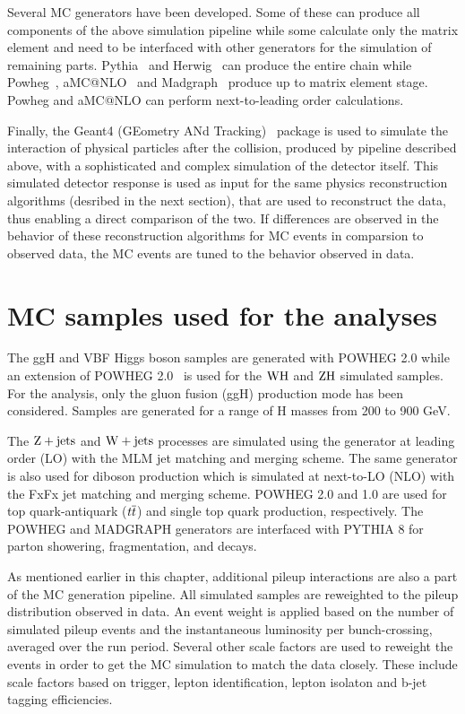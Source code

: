 Several MC generators have been developed. Some of these can produce all components of the above simulation pipeline while some calculate only the matrix element and need to be interfaced with other generators for the simulation of remaining parts. Pythia~\cite{Sjostrand:pythia8} and Herwig~\cite{herwig} can produce the entire chain while Powheg~\cite{Nason:2004rx,Frixione:2007vw, Alioli:2010xd, Alioli:2010xa, Alioli:2008tz, Bagnaschi:2011tu}, aMC@NLO~\cite{Alwall:2014} and Madgraph~\cite{Alwall:2011uj} produce up to matrix element stage. Powheg and aMC@NLO can perform next-to-leading order calculations. 

Finally, the Geant4 (GEometry ANd Tracking)~\cite{GEANT4} package is used to simulate the interaction of physical particles after the collision, produced by pipeline described  above, with a sophisticated and complex simulation of the detector itself. This simulated detector response is used as input for the same physics reconstruction algorithms (desribed in the next section), that are used to reconstruct the data, thus enabling a direct comparison of the two. If differences are observed in the behavior of these reconstruction algorithms for MC events in comparsion to observed data, the MC events are tuned to the behavior observed in data. 


\section{MC samples used for the analyses}
\label{samples_mc}

The {ggH} and VBF Higgs boson samples are generated with POWHEG 2.0 while an extension of POWHEG 2.0~\cite{Luisoni:2013kna} is used for the $\text{W}\text{H}$ and $\text{Z}\text{H}$ simulated samples. For the \Hmue analysis, only the gluon fusion (ggH) production mode has been considered. Samples are generated for a range of H masses from 200 to 900 GeV.

The $\text{Z}+\text{jets}$ and $\text{W}+\text{jets}$ processes are simulated using the \aMCATNLO generator at leading order (LO) with the MLM jet matching and merging scheme. The same generator is also used for diboson production which is simulated at  next-to-LO (NLO) with the FxFx jet matching and merging scheme. POWHEG 2.0 and 1.0 are used for top quark-antiquark ($t\overline{t}$) and single top quark production, respectively. The POWHEG and MADGRAPH generators are interfaced with PYTHIA 8 for parton showering, fragmentation, and decays. 

As mentioned earlier in this chapter, additional pileup interactions are also a part of the MC generation pipeline. All simulated samples are reweighted to the pileup distribution observed in data. An event weight is applied based on the number of simulated pileup events and the instantaneous luminosity per bunch-crossing, averaged over the run period. Several other scale factors  are used to reweight the events in order to get the MC simulation to match the data closely. These include scale factors based on trigger, lepton identification, lepton isolaton and b-jet tagging efficiencies.

